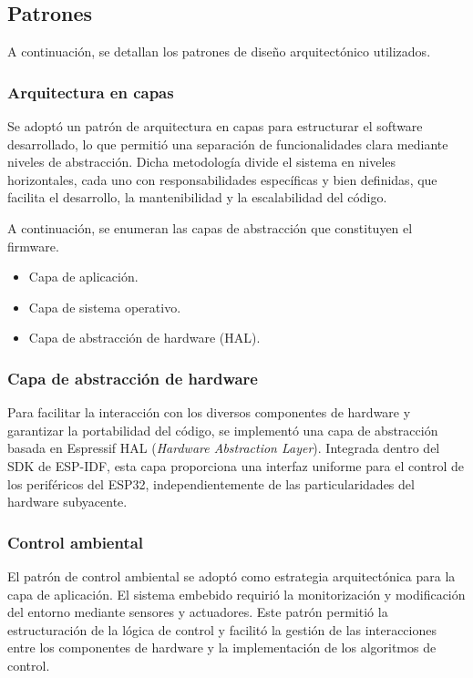 \subsection{Patrones}

A continuación, se detallan los patrones de diseño arquitectónico utilizados.

\subsubsection{Arquitectura en capas}
Se adoptó un patrón de arquitectura en capas para estructurar el software desarrollado, lo que permitió una separación de funcionalidades clara mediante niveles de abstracción. Dicha metodología divide el sistema en niveles horizontales, cada uno con responsabilidades específicas y bien definidas, que facilita el desarrollo, la mantenibilidad y la escalabilidad del código.

A continuación, se enumeran las capas de abstracción que constituyen el firmware.

\begin{itemize}
	\item Capa de aplicación.
	\item Capa de sistema operativo.
	\item Capa de abstracción de hardware (HAL).
\end{itemize}


\subsubsection{Capa de abstracción de hardware}

Para facilitar la interacción con los diversos componentes de hardware y garantizar la portabilidad del código, se implementó una capa de abstracción basada en Espressif HAL (\textit{Hardware Abstraction Layer}). Integrada dentro del SDK de ESP-IDF, esta capa proporciona una interfaz uniforme para el control de los periféricos del ESP32, independientemente de las particularidades del hardware subyacente.

\subsubsection{Control ambiental}

El patrón de control ambiental se adoptó como estrategia arquitectónica para la capa de aplicación. El sistema embebido requirió la monitorización y modificación del entorno mediante sensores y actuadores. Este patrón permitió la estructuración de la lógica de control y facilitó la gestión de las interacciones entre los componentes de hardware y la implementación de los algoritmos de control.


